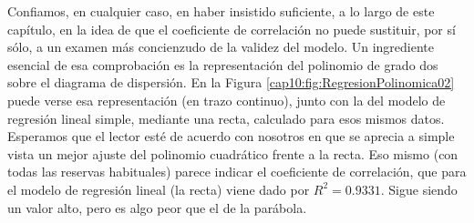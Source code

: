 \begin{ejemplo}
Confiamos, en cualquier caso, en haber insistido suficiente, a lo largo de este capítulo, en la idea de que el coeficiente de correlación no puede sustituir, por sí sólo, a un examen más concienzudo de la validez del modelo. Un ingrediente esencial de esa comprobación es la representación del polinomio de grado dos sobre el diagrama de dispersión. En la Figura \ref{cap10:fig:RegresionPolinomica02} puede verse esa representación (en trazo continuo),  junto con la del modelo de regresión lineal simple, mediante una recta, calculado para esos mismos datos. Esperamos que el lector esté de acuerdo con nosotros en que se aprecia a simple vista un mejor ajuste del polinomio cuadrático frente a la recta. Eso mismo (con todas las reservas habituales) parece indicar el coeficiente de correlación, que para el modelo de regresión lineal (la recta) viene dado por $R^2=0.9331$. Sigue siendo un valor alto, pero es algo peor que el de la parábola.


\end{ejemplo}
